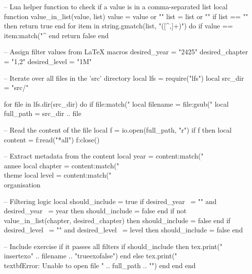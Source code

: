 \documentclass[a4paper,12pt]{report}
\def\desiredYear{2425}
\def\desiredChapter{1,2}
\def\desiredLevel{1M}
\edef\luaDesiredYear{\desiredYear}
\edef\luaDesiredChapter{\desiredChapter}
\edef\luaDesiredLevel{\desiredLevel}
\begin{document}

\begin{luacode}

-- Lua helper function to check if a value is in a comma-separated list
local function value_in_list(value, list)
    value = value or ""
    list = list or ""
    if list == "" then return true end
    for item in string.gmatch(list, "([^,]+)") do
        if value == item:match("^%
    end
    return false
end

-- Assign filter values from LaTeX macros
desired_year = "\luaDesiredYear"
desired_chapter = "\luaDesiredChapter"
desired_level = "\luaDesiredLevel"

-- Iterate over all files in the 'src' directory
local lfs = require("lfs")
local src_dir = "src/"

for file in lfs.dir(src_dir) do
    if file:match("%
        local filename = file:gsub("%
        local full_path = src_dir .. file
        
        -- Read the content of the file
        local f = io.open(full_path, "r")
        if f then
            local content = f:read("*all")
            f:close()
            
            -- Extract metadata from the content
            local year = content:match("\\annee%
            local chapter = content:match("\\theme%
            local level = content:match("\\organisation%
            
            -- Filtering logic
            local should_include = true
            if desired_year ~= "" and desired_year ~= year then
                should_include = false
            end
            if not value_in_list(chapter, desired_chapter) then
                should_include = false
            end
            if desired_level ~= "" and desired_level ~= level then
                should_include = false
            end
            
            -- Include exercise if it passes all filters
            if should_include then
            	tex.print("\\insertexo{" .. filename .. "}{true}{exo}{false}")
            end
        else
            tex.print("\\textbf{Error: Unable to open file " .. full_path .. "}")
        end
    end
end

\end{luacode}
\end{document}
